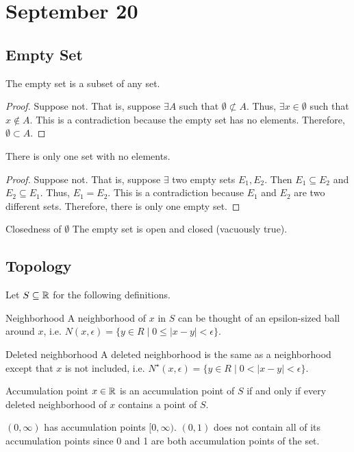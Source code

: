 \chapter{September 20}

\section{Empty Set}
\begin{theorem}{}{}
    The empty set is a subset of any set.
\end{theorem}
\begin{proof}
    Suppose not. That is, suppose $\exists A$ such that $\emptyset \not\subset A$. Thus, $\exists x \in \emptyset$ such that $x \not\in A$. This is a contradiction because the empty set has no elements. Therefore, $\emptyset \subset A$.
\end{proof}

\begin{theorem}{}{}
    There is only one set with no elements.
\end{theorem}
\begin{proof}
    Suppose not. That is, suppose $\exists$ two empty sets $E_1, E_2$. Then $E_1 \subseteq E_2$ and $E_2 \subseteq E_1$. Thus, $E_1 = E_2$. This is a contradiction because $E_1$ and $E_2$ are two different sets. Therefore, there is only one empty set.
\end{proof}
\begin{note}{Closedness of $\emptyset$}{}
    The empty set is open and closed (vacuously true).
\end{note}

\section{Topology}
Let $S \subseteq \mathbb{R}$ for the following definitions.

\begin{definition}{Neighborhood}{}
    A neighborhood of $x$ in $S$ can be thought of an epsilon-sized ball around $x$, i.e. $N(x, \epsilon) = \{ y \in R \mid 0 \leq |x - y| < \epsilon \}$.
\end{definition}
\begin{definition}{Deleted neighborhood}{}
    A deleted neighborhood is the same as a neighborhood except that $x$ is not included, i.e. $N^\star(x, \epsilon) = \{ y \in R \mid 0 < |x - y| < \epsilon \}$.
\end{definition}

\begin{definition}{Accumulation point}{}
    $x \in \mathbb{R}$ is an accumulation point of $S$ if and only if every deleted neighborhood of $x$ contains a point of $S$.
\end{definition}
\begin{note}
    $(0, \infty)$ has accumulation points $[0, \infty)$. $(0, 1)$ does not contain all of its accumulation points since 0 and 1 are both accumulation points of the set.
\end{note}

